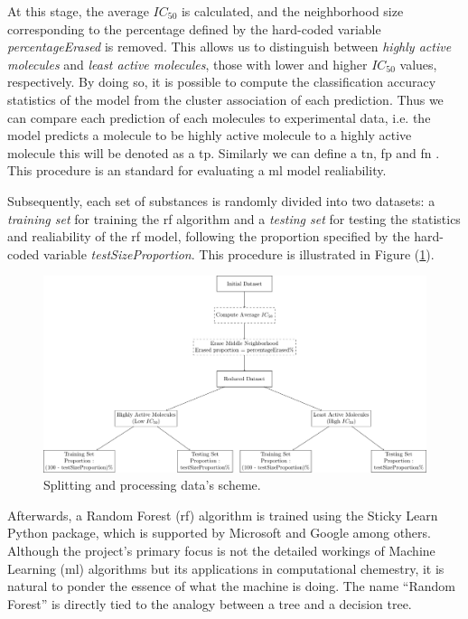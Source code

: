 \documentclass[11pt]{article}
\begin{document}
At this stage, the average $IC_{50}$ is calculated, and the neighborhood size corresponding to the percentage defined by the hard-coded variable \emph{percentageErased} is removed. This allows us to distinguish between \emph{highly active molecules} and \emph{least active molecules}, those with lower and higher $IC_{50}$ values, respectively. By doing so, it is possible to compute the classification accuracy statistics of the model from the cluster association of each prediction. Thus we can compare each prediction of each molecules to experimental data, i.e. the model predicts a molecule to be highly active molecule to a highly active molecule this will be denoted as a \gls{tp}. Similarly we can define a \gls{tn}, \gls{fp} and \gls{fn} . This procedure is an standard for evaluating a \gls{ml} model realiability. 

Subsequently, each set of substances is randomly divided into two datasets: a \emph{training set} for training the \gls{rf} algorithm and a \emph{testing set} for testing the statistics and realiability of the \gls{rf} model, following the proportion specified by the hard-coded variable \emph{testSizeProportion}. This procedure is illustrated in Figure (\ref{FigureDataSplittingDiagram}).

\begin{figure}[H]
\centering
\includegraphics[width = \textwidth]{GeneralSources/DataSplittingDiagram.pdf}
\caption{Splitting and processing data's scheme.}
\label{FigureDataSplittingDiagram}
\end{figure}

Afterwards, a Random Forest (\gls{rf}) algorithm is trained using the Sticky Learn \cite{PythonPackageStickitLearn} Python package, which is supported by Microsoft and Google among others. Although the project’s primary focus is not the detailed workings of Machine Learning (\gls{ml}) algorithms but its applications in computational chemestry, it is natural to ponder the essence of what the machine is doing. The name “Random Forest” is directly tied to the analogy between a tree and a decision tree. \par
\end{document}
